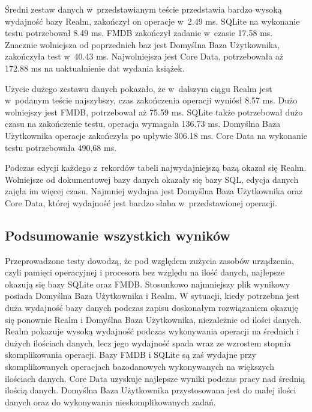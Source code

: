 Średni zestaw danych w~przedstawianym teście przedstawia bardzo wysoką wydajność bazy Realm, zakończył on operacje w~2.49 ms. SQLite na wykonanie testu potrzebował 8.49 ms. FMDB zakończył zadanie w~czasie 17.58 ms. Znacznie wolniejsza od poprzednich baz jest Domyślna Baza Użytkownika, zakończyła test w~40.43 ms. Najwolniejsza jest Core Data, potrzebowała aż 172.88  ms na uaktualnienie dat wydania książek.

Użycie dużego zestawu danych pokazało, że w~dalszym ciągu Realm jest w~podanym teście najszybszy, czas zakończenia operacji wyniósł 8.57 ms. Dużo wolniejszy jest FMDB, potrzebował aż 75.59 ms. SQLite także potrzebował dużo czasu na zakończenie testu, operacja wymagała 136.73 ms. Domyślna Baza Użytkownika operacje zakończyła po upływie 306.18 ms. Core Data na wykonanie testu potrzebowała 490,68 ms. 

Podczas edycji każdego z~rekordów tabeli najwydajniejszą bazą okazał się Realm. Wolniejsze od dokumentowej bazy danych okazały się bazy SQL, edycja danych zajęła im więcej czasu. Najmniej wydajna jest Domyślna Baza Użytkownika oraz Core Data, której wydajność jest bardzo słaba w~przedstawionej operacji. 

\subsection{Podsumowanie wszystkich wyników}

Przeprowadzone testy dowodzą, że pod względem zużycia zasobów urządzenia, czyli pamięci operacyjnej i procesora bez względu na ilość danych, najlepsze okazują się bazy SQLite oraz FMDB. Stosunkowo najmniejszy plik wynikowy posiada Domyślna Baza Użytkownika i Realm. W sytuacji, kiedy potrzebna jest duża wydajność bazy danych podczas zapisu doskonałym rozwiązaniem okazuję się ponownie Realm i Domyślna Baza Użytkownika, niezależnie od ilości danych. Realm pokazuje wysoką wydajność podczas wykonywania operacji na średnich i dużych ilościach danych, lecz jego wydajność spada wraz ze wzrostem stopnia skomplikowania operacji. Bazy FMDB i SQLite są zaś wydajne przy skomplikowanych operacjach bazodanowych wykonywanych na większych ilościach danych. Core Data uzyskuje najlepsze wyniki podczas pracy nad średnią ilością danych. Domyślna Baza Użytkownika przystosowana jest do małej ilości danych oraz do wykonywania nieskomplikowanych zadań.